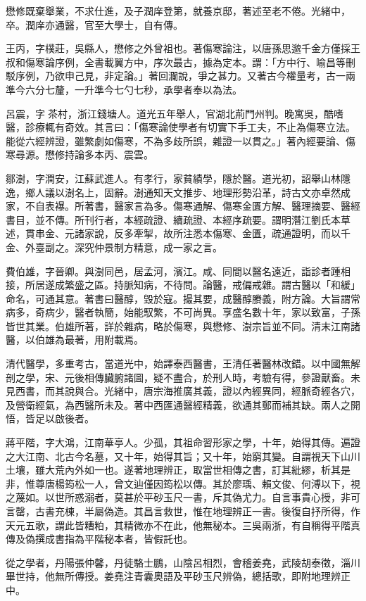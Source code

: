 \begin{pinyinscope}
懋修既棄舉業，不求仕進，及子潤庠登第，就養京邸，著述至老不倦。光緒中，卒。潤庠亦通醫，官至大學士，自有傳。

王丙，字樸莊，吳縣人，懋修之外曾祖也。著傷寒論注，以唐孫思邈千金方僅採王叔和傷寒論序例，全書載翼方中，序次最古，據為定本。謂：「方中行、喻昌等刪駁序例，乃欲申己見，非定論。」著回瀾說，爭之甚力。又著古今權量考，古一兩準今六分七釐，一升準今七勺七秒，承學者奉以為法。

呂震，字茶村，浙江錢塘人。道光五年舉人，官湖北荊門州判。晚寓吳，酷嗜醫，診療輒有奇效。其言曰：「傷寒論使學者有切實下手工夫，不止為傷寒立法。能從六經辨證，雖繁劇如傷寒，不為多歧所誤，雜證一以貫之。」著內經要論、傷寒尋源。懋修持論多本丙、震雲。

鄒澍，字潤安，江蘇武進人。有孝行，家貧績學，隱於醫。道光初，詔舉山林隱逸，鄉人議以澍名上，固辭。澍通知天文推步、地理形勢沿革，詩古文亦卓然成家，不自表襮。所著書，醫家言為多。傷寒通解、傷寒金匱方解、醫理摘要、醫經書目，並不傳。所刊行者，本經疏證、續疏證、本經序疏要。謂明潛江劉氏本草述，貫串金、元諸家說，反多牽掣，故所注悉本傷寒、金匱，疏通證明，而以千金、外臺副之。深究仲景制方精意，成一家之言。

費伯雄，字晉卿。與澍同邑，居孟河，濱江。咸、同間以醫名遠近，詣診者踵相接，所居遂成繁盛之區。持脈知病，不待問。論醫，戒偏戒雜。謂古醫以「和緩」命名，可通其意。著書曰醫醇，毀於寇。撮其要，成醫醇賸義，附方論。大旨謂常病多，奇病少，醫者執簡，始能馭繁，不可尚異。享盛名數十年，家以致富，子孫皆世其業。伯雄所著，詳於雜病，略於傷寒，與懋修、澍宗旨並不同。清末江南諸醫，以伯雄為最著，用附載焉。

清代醫學，多重考古，當道光中，始譯泰西醫書，王清任著醫林改錯。以中國無解剖之學，宋、元後相傳臟腑諸圖，疑不盡合，於刑人時，考驗有得，參證獸畜。未見西書，而其說與合。光緒中，唐宗海推廣其義，證以內經異同，經脈奇經各穴，及營衛經氣，為西醫所未及。著中西匯通醫經精義，欲通其郵而補其缺。兩人之開悟，皆足以啟後者。

蔣平階，字大鴻，江南華亭人。少孤，其祖命習形家之學，十年，始得其傳。遍證之大江南、北古今名墓，又十年，始得其旨；又十年，始窮其變。自謂視天下山川土壤，雖大荒內外如一也。遂著地理辨正，取當世相傳之書，訂其紕繆，析其是非，惟尊唐楊筠松一人，曾文辿僅因筠松以傳。其於廖瑀、賴文俊、何溥以下，視之蔑如。以世所惑溺者，莫甚於平砂玉尺一書，斥其偽尤力。自言事貴心授，非可言罄，古書充棟，半屬偽造。其昌言救世，惟在地理辨正一書。後復自抒所得，作天元五歌，謂此皆糟粕，其精微亦不在此，他無秘本。三吳兩浙，有自稱得平階真傳及偽撰成書指為平階秘本者，皆假託也。

從之學者，丹陽張仲馨，丹徒駱士鵬，山陰呂相烈，會稽姜堯，武陵胡泰徵，淄川畢世持，他無所傳授。姜堯注青囊奧語及平砂玉尺辨偽，總括歌，即附地理辨正中。


\end{pinyinscope}
